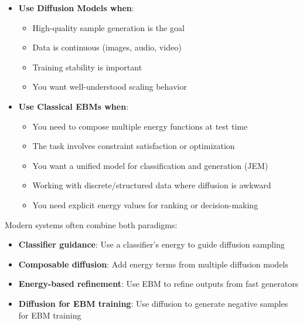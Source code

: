 \begin{remark}\leavevmode
    \begin{itemize}
        \item \textbf{Use Diffusion Models when}:
        \begin{itemize}
            \item High-quality sample generation is the goal
            \item Data is continuous (images, audio, video)
            \item Training stability is important
            \item You want well-understood scaling behavior
        \end{itemize}

        \item \textbf{Use Classical EBMs when}:
        \begin{itemize}
            \item You need to compose multiple energy functions at test time
            \item The task involves constraint satisfaction or optimization
            \item You want a unified model for classification and generation (JEM)
            \item Working with discrete/structured data where diffusion is awkward
            \item You need explicit energy values for ranking or decision-making
        \end{itemize}
    \end{itemize}
\end{remark}

\begin{remark}
    Modern systems often combine both paradigms:
    \begin{itemize}
        \item \textbf{Classifier guidance}: Use a classifier's energy to guide diffusion sampling
        \item \textbf{Composable diffusion}: Add energy terms from multiple diffusion models
        \item \textbf{Energy-based refinement}: Use EBM to refine outputs from fast generators
        \item \textbf{Diffusion for EBM training}: Use diffusion to generate negative samples for EBM training
    \end{itemize}
\end{remark}

